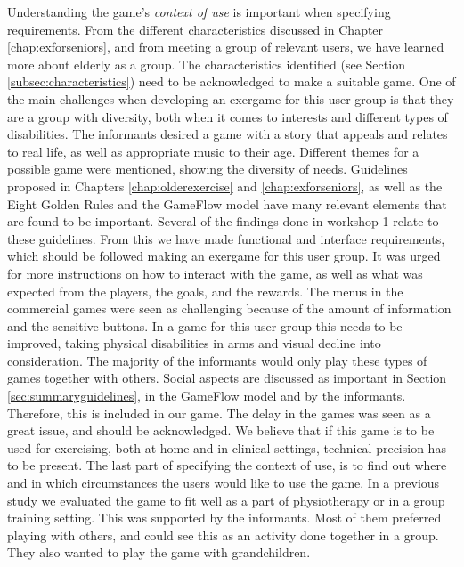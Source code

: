 Understanding the game's \emph{context of use} is important when specifying requirements. From the different characteristics discussed in Chapter \ref{chap:exforseniors}, and from meeting a group of relevant users, we have learned more about elderly as a group. The characteristics identified (see Section \ref{subsec:characteristics}) need to be acknowledged to make a suitable game. One of the main challenges when developing an exergame for this user group is that they are a group with diversity, both when it comes to interests and different types of disabilities. The informants desired a game with a story that appeals and relates to real life, as well as appropriate music to their age. Different themes for a possible game were mentioned, showing the diversity of needs. Guidelines proposed in Chapters \ref{chap:olderexercise} and \ref{chap:exforseniors}, as well as the Eight Golden Rules and the GameFlow model have many relevant elements that are found to be important. Several of the findings done in workshop 1 relate to these guidelines. From this we have made functional and interface requirements, which should be followed making an exergame for this user group. It was urged for more instructions on how to interact with the game, as well as what was expected from the players, the goals, and the rewards. The menus in the commercial games were seen as challenging because of the amount of information and the sensitive buttons. In a game for this user group this needs to be improved, taking physical disabilities in arms and visual decline into consideration. The majority of the informants would only play these types of games together with others. Social aspects are discussed as important in Section \ref{sec:summaryguidelines}, in the GameFlow model and by the informants. Therefore, this is included in our game. The delay in the games was seen as a great issue, and should be acknowledged. We believe that if this game is to be used for exercising, both at home and in clinical settings, technical precision has to be present. The last part of specifying the context of use, is to find out where and in which circumstances the users would like to use the game. In a previous study \cite{project} we evaluated the game to fit well as a part of physiotherapy or in a group training setting. This was supported by the informants. Most of them preferred playing with others, and could see this as an activity done together in a group. They also wanted to play the game with grandchildren.

